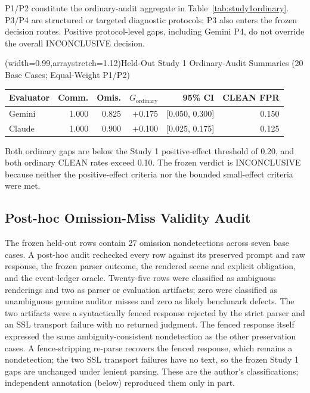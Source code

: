 \documentclass{ieeeaccess}
\newcommand{\Gordinary}{G_{\mathrm{ordinary}}}
\begin{document}
P1/P2 constitute the ordinary-audit aggregate in Table~\ref{tab:study1ordinary}. P3/P4 are structured or targeted diagnostic protocols; P3 also enters the frozen decision routes. Positive protocol-level gaps, including Gemini P4, do not override the overall INCONCLUSIVE decision.

\Table[t](width=0.99\columnwidth,arraystretch=1.12){Held-Out Study 1 Ordinary-Audit Summaries (20 Base Cases; Equal-Weight P1/P2) \label{tab:study1ordinary}}{\setlength{\tabcolsep}{4pt}\begin{tabular}{@{}lrrrrr@{}}
\toprule
Evaluator & Comm. & Omis. & $\Gordinary$ & 95\% CI & CLEAN FPR\\
\midrule
Gemini & 1.000 & 0.825 & +0.175 & [0.050, 0.300] & 0.150\\
Claude & 1.000 & 0.900 & +0.100 & [0.025, 0.175] & 0.125\\
\bottomrule
\end{tabular}}

Both ordinary gaps are below the Study 1 positive-effect threshold of 0.20, and both ordinary CLEAN rates exceed 0.10. The frozen verdict is INCONCLUSIVE because neither the positive-effect criteria nor the bounded small-effect criteria were met.

\subsection{Post-hoc Omission-Miss Validity Audit}
\label{sec:study1audit}
The frozen held-out rows contain 27 omission nondetections across seven base cases. A post-hoc audit rechecked every row against its preserved prompt and raw response, the frozen parser outcome, the rendered scene and explicit obligation, and the event-ledger oracle. Twenty-five rows were classified as ambiguous renderings and two as parser or evaluation artifacts; zero were classified as unambiguous genuine auditor misses and zero as likely benchmark defects. The two artifacts were a syntactically fenced response rejected by the strict parser and an SSL transport failure with no returned judgment. The fenced response itself expressed the same ambiguity-consistent nondetection as the other preservation cases. A fence-stripping re-parse recovers the fenced response, which remains a nondetection; the two SSL transport failures have no text, so the frozen Study 1 gaps are unchanged under lenient parsing. These are the author's classifications; independent annotation (below) reproduced them only in part.
\end{document}
